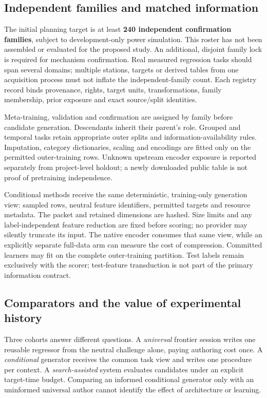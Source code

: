 \subsection{Independent families and matched information}

The initial planning target is at least \textbf{240 independent confirmation
families}, subject to development-only power simulation. This roster has not
been assembled or evaluated for the proposed study. An additional, disjoint
family lock is required for mechanism confirmation. Real measured regression
tasks should span several domains; multiple stations, targets or derived tables
from one acquisition process must not inflate the independent-family count.
Each registry record binds provenance, rights, target units, transformations,
family membership, prior exposure and exact source/split identities.

Meta-training, validation and confirmation are assigned by family before
candidate generation. Descendants inherit their parent's role. Grouped and
temporal tasks retain appropriate outer splits and information-availability
rules. Imputation, category dictionaries, scaling and encodings are fitted only
on the permitted outer-training rows. Unknown upstream encoder exposure is
reported separately from project-level holdout; a newly downloaded public table
is not proof of pretraining independence.

Conditional methods receive the same deterministic, training-only generation
view: sampled rows, neutral feature identifiers, permitted targets and resource
metadata. The packet and retained dimensions are hashed. Size limits and any
label-independent feature reduction are fixed before scoring; no provider may
silently truncate its input. The native encoder consumes that same view, while
an explicitly separate full-data arm can measure the cost of compression.
Committed learners may fit on the complete outer-training partition. Test labels
remain exclusively with the scorer; test-feature transduction is not part of the
primary information contract.

\subsection{Comparators and the value of experimental history}

Three cohorts answer different questions. A \emph{universal} frontier session
writes one reusable regressor from the neutral challenge alone, paying authoring
cost once. A \emph{conditional} generator receives the common task view and
writes one procedure per context. A \emph{search-assisted} system evaluates
candidates under an explicit target-time budget. Comparing an informed
conditional generator only with an uninformed universal author cannot identify
the effect of architecture or learning.

